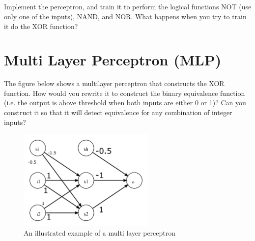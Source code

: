 \subsection{\marginsymbol}
Implement the perceptron, and train it to perform the logical functions NOT (use only one of the inputs), NAND, and NOR.
What happens when you try to train it do the XOR function?

\section{Multi Layer Perceptron (MLP)}
The figure below shows a multilayer perceptron that constructs the XOR function.
How would you rewrite it to construct the binary equivalence function
(i.e. the output is above threshold when both inputs are either 0 or 1)?
Can you construct it so that it will detect equivalence for any combination of integer inputs?

\begin{figure}[H]
\begin{center}
\includegraphics[width=0.6\textwidth]{fig2.png}
\caption{An illustrated example of a multi layer perceptron}
\label{fig:mlp}
\end{center}
\end{figure}



